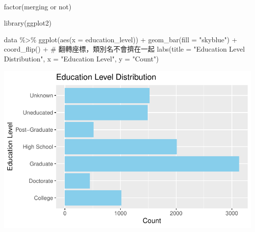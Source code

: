 \documentclass[
  letterpaper,
  DIV=11,
  numbers=noendperiod]{scrartcl}
\makeatletter
\let\oldparagraph\paragraph
\renewcommand{\paragraph}{
    \@ifstar
      \xxxParagraphStar
      \xxxParagraphNoStar
  }
\newcommand{\xxxParagraphStar}[1]{\oldparagraph*{#1}\mbox{}}
\newcommand{\xxxParagraphNoStar}[1]{\oldparagraph{#1}\mbox{}}
\newenvironment{Shaded}{\begin{snugshade}}{\end{snugshade}}
\newcommand{\AttributeTok}[1]{\textcolor[rgb]{0.40,0.45,0.13}{#1}}
\newcommand{\CommentTok}[1]{\textcolor[rgb]{0.37,0.37,0.37}{#1}}
\newcommand{\FunctionTok}[1]{\textcolor[rgb]{0.28,0.35,0.67}{#1}}
\newcommand{\NormalTok}[1]{\textcolor[rgb]{0.00,0.23,0.31}{#1}}
\newcommand{\SpecialCharTok}[1]{\textcolor[rgb]{0.37,0.37,0.37}{#1}}
\newcommand{\StringTok}[1]{\textcolor[rgb]{0.13,0.47,0.30}{#1}}
\makeatother
\begin{document}
\paragraph{factor(merging or not)}\label{factormerging-or-not}

\begin{Shaded}
\begin{Highlighting}[]
\FunctionTok{library}\NormalTok{(ggplot2)}


\NormalTok{data }\SpecialCharTok{\%\textgreater{}\%} 
  \FunctionTok{ggplot}\NormalTok{(}\FunctionTok{aes}\NormalTok{(}\AttributeTok{x =}\NormalTok{ education\_level)) }\SpecialCharTok{+}
  \FunctionTok{geom\_bar}\NormalTok{(}\AttributeTok{fill =} \StringTok{"skyblue"}\NormalTok{) }\SpecialCharTok{+}
  \FunctionTok{coord\_flip}\NormalTok{() }\SpecialCharTok{+}  \CommentTok{\# 翻轉座標，類別名不會擠在一起}
  \FunctionTok{labs}\NormalTok{(}\AttributeTok{title =} \StringTok{"Education Level Distribution"}\NormalTok{,}
       \AttributeTok{x =} \StringTok{"Education Level"}\NormalTok{,}
       \AttributeTok{y =} \StringTok{"Count"}\NormalTok{)}
\end{Highlighting}
\end{Shaded}

\includegraphics{Tackling-Attrition-at-Tifosi-Bank_files/figure-pdf/unnamed-chunk-7-1.pdf}
\end{document}
